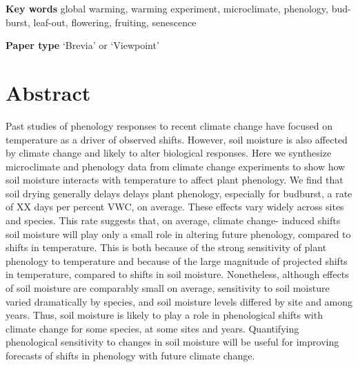 \documentclass{article}
\begin{document}
\textbf{Key words} global warming, warming experiment, microclimate, phenology, bud-burst, leaf-out, flowering, fruiting, senescence 


\textbf{Paper type} `Brevia' or `Viewpoint'








\linenumbers
\section*{Abstract}
Past studies of phenology responses to recent climate change have focused on temperature as a driver of observed shifts. However, soil moisture is also affected by climate change and likely to alter biological responses. Here we synthesize microclimate and phenology data from climate change experiments to show how soil moisture interacts with temperature to affect plant phenology. We find that soil drying generally delays delays plant phenology, especially for budburst, a rate of XX days per percent VWC, on average. These effects vary widely across sites and species. This rate suggests that, on average, climate change- induced shifts soil moisture will play only a small role in altering future phenology, compared to shifts in temperature. This is both because of the strong sensitivity of plant phenology to temperature and because of the large magnitude of projected shifts in temperature, compared to shifts in soil moisture. Nonetheless, although effects of soil moisture are comparably small on average, sensitivity to soil moisture varied dramatically by species, and soil moisture levels differed by site and among years. Thus, soil moisture is likely to play a role in phenological shifts with climate change for some species, at some sites and years. Quantifying phenological sensitivity to changes in soil moisture will be useful for improving forecasts of shifts in phenology with future climate change.  

\newpage
\end{document}
